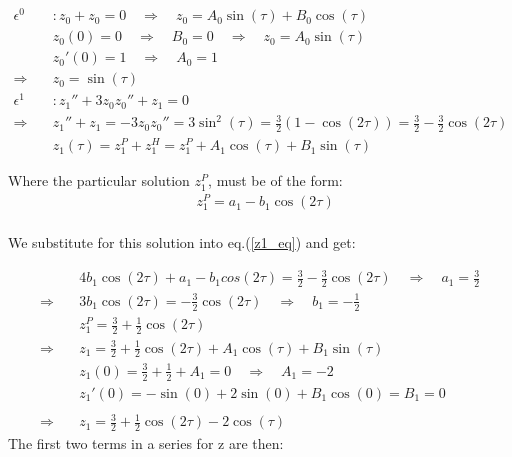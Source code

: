 \documentclass[a4paper,10pt]{article}
\begin{document}
\begin{align}
\epsilon^0 &: z_0 + z_0 = 0 \quad \Rightarrow \quad 
z_0 = A_0 \sin(\tau) + B_0 \cos(\tau) \label{z0_eq}\\
&z_0(0) = 0 \quad \Rightarrow \quad B_0 = 0 \quad \Rightarrow \quad z_0 = A_0 \sin(\tau) \nonumber \\
&z_0'(0) = 1 \quad \Rightarrow \quad A_0 = 1 \nonumber \\ 
\Rightarrow \quad &z_0=\sin(\tau) \label{z0_sol}\\[6mm]
\epsilon^1 &: z_1'' + 3z_0 z_0'' + z_1 = 0 \nonumber \\
\Rightarrow \quad &z_1'' + z_1 = -3 z_0 z_0'' = 3 \sin^2(\tau) = \frac{3}{2}(1-\cos(2 \tau)) = \frac{3}{2} - \frac{3}{2} \cos(2 \tau) \label{z1_eq}\\
&z_1(\tau) = z_1^P + z_1^H = z_1^P + A_1 \cos(\tau) + B_1 \sin(\tau) \nonumber
\end{align}

Where the particular solution $z_1^P$, must be of the form:\\
\begin{align}
&z_1^P = a_1 - b_1 \cos(2 \tau) \nonumber\\
\end{align}

We substitute for this solution into eq.(\ref{z1_eq}) and get:

\begin{align}
&4 b_1 \cos(2 \tau) + a_1 - b_1 cos(2 \tau) = \frac{3}{2} - \frac{3}{2} \cos (2 \tau) \quad \Rightarrow \quad a_1 = \frac{3}{2} \nonumber \\
\Rightarrow \quad &3b_1 \cos(2 \tau) = - \frac{3}{2} \cos(2 \tau) \quad \Rightarrow \quad b_1 = -\frac{1}{2} \nonumber \\
&z_1^P = \frac{3}{2} + \frac{1}{2}\cos(2 \tau) \nonumber\\
\Rightarrow \quad &z_1 = \frac{3}{2} + \frac{1}{2}\cos(2 \tau) + A_1 \cos(\tau) + B_1 \sin(\tau) \nonumber \\
&z_1(0) = \frac{3}{2} + \frac{1}{2} + A_1 = 0 \quad 
\Rightarrow \quad A_1 = -2 \nonumber \\
&z_1'(0) = -\sin(0) + 2\sin(0) + B_1 \cos(0) = B_1 = 0 \nonumber \\\nonumber\\
\Rightarrow \quad &z_1 = \frac{3}{2} + \frac{1}{2} \cos(2 \tau) - 2 \cos(\tau) \label{z1_sol}
\end{align}
The first two terms in a series for z are then:
\end{document}
